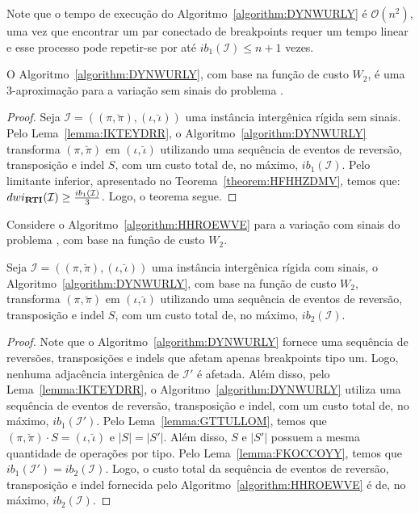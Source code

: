 Note que o tempo de execução do Algoritmo~\ref{algorithm:DYNWURLY} é $\mathcal{O}(n^2)$, uma vez que encontrar um par conectado de breakpoints requer um tempo linear e esse processo pode repetir-se por até $ib_1(\mathcal{I}) \le n + 1$ vezes.

\begin{theorem}\label{theorem:HXFXWAIA}
O Algoritmo~\ref{algorithm:DYNWURLY}, com base na função de custo $W_2$, é uma $3$-aproximação para a variação sem sinais do problema \SbWIRTI{}.
\end{theorem}
\begin{proof}
Seja $\mathcal{I}=((\pi,\breve\pi),(\iota,\breve\iota))$ uma instância intergênica rígida sem sinais. Pelo Lema~\ref{lemma:IKTEYDRR}, o Algoritmo~\ref{algorithm:DYNWURLY} transforma $(\pi,\breve\pi)$ em $(\iota,\breve\iota)$ utilizando uma sequência de eventos de reversão, transposição e indel $S$, com um custo total de, no máximo, $ib_1(\mathcal{I})$. Pelo limitante inferior, apresentado no Teorema~\ref{theorem:HFHHZDMV}, temos que: $dwi_{\textbf{RTI}}(\mathcal{I}) \ge \frac{ib_1(\mathcal{I})}{3}$. Logo, o teorema segue.
\end{proof}

Considere o Algoritmo~\ref{algorithm:HHROEWVE} para a variação com sinais do problema \SbWIRTI{}, com base na função de custo $W_2$.



\begin{lemma}\label{lemma:MBYKFLMR}
Seja $\mathcal{I} = ((\pi,\breve\pi),(\iota,\breve\iota))$ uma instância intergênica rígida com sinais, o Algoritmo~\ref{algorithm:DYNWURLY}, com base na função de custo $W_2$, transforma $(\pi,\breve\pi)$ em $(\iota,\breve\iota)$ utilizando uma sequência de eventos de reversão, transposição e indel $S$, com um custo total de, no máximo, $ib_2(\mathcal{I})$.
\end{lemma}
\begin{proof}
Note que o Algoritmo~\ref{algorithm:DYNWURLY} fornece uma sequência de reversões, transposições e indels que afetam apenas breakpoints tipo um. Logo, nenhuma adjacência intergênica de $\mathcal{I'}$ é afetada. Além disso, pelo Lema~\ref{lemma:IKTEYDRR}, o Algoritmo~\ref{algorithm:DYNWURLY} utiliza uma sequência de eventos de reversão, transposição e indel, com um custo total de, no máximo, $ib_1(\mathcal{I'})$. Pelo Lema~\ref{lemma:GTTULLOM}, temos que $(\pi,\breve\pi) \cdot S = (\iota,\breve\iota)$ e $|S| = |S'|$. Além disso, $S$ e $|S'|$ possuem a mesma quantidade de operações por tipo. Pelo Lema~\ref{lemma:FKOCCOYY}, temos que $ib_1(\mathcal{I'}) = ib_2(\mathcal{I})$. Logo, o custo total da sequência de eventos de reversão, transposição e indel fornecida pelo Algoritmo~\ref{algorithm:HHROEWVE} é de, no máximo, $ib_2(\mathcal{I})$.
\end{proof}

